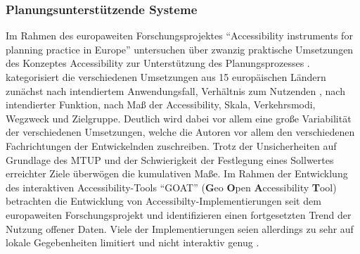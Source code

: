 \documentclass[11pt,pdftex,a4paper]{scrartcl}
\begin{document}
	\subsubsection{Planungsunterstützende Systeme}
	Im Rahmen des europaweiten Forschungsprojektes \enquote{Accessibility instruments for planning practice in Europe} \parencite{COSTActionTU1002} untersuchen \textcites{papaAccessibilityInstrumentsPlanning2016}{silvaAccessibilityInstrumentsPlanning2017}{papaLearningProcessAccessibility2017} über zwanzig praktische Umsetzungen des Konzeptes Accessibility zur Unterstützung des Planungsprozesses \parencite[\enquote{Planning Support Systems (PSS)}][135]{silvaAccessibilityInstrumentsPlanning2017}.
	\textcite{papaAccessibilityInstrumentsPlanning2016} kategorisiert die verschiedenen Umsetzungen aus 15 europäischen Ländern zunächst nach intendiertem Anwendungsfall, Verhältnis zum Nutzenden , nach intendierter Funktion, nach Maß der Accessibility, Skala, Verkehrsmodi, Wegzweck und Zielgruppe.
	Deutlich wird dabei vor allem eine große Variabilität der verschiedenen Umsetzungen, welche die Autoren vor allem den verschiedenen Fachrichtungen der Entwickelnden zuschreiben. Trotz der Unsicherheiten auf Grundlage des MTUP und der Schwierigkeit der Festlegung eines Sollwertes erreichter Ziele \parencites[vgl.][]{xiExploringImpactDifferent2018}[47]{levinsonTransportAccessManual2020} überwögen die kumulativen Maße.
	Im Rahmen der Entwicklung des interaktiven Accessibility-Tools \enquote{GOAT} (\textbf{G}eo \textbf{O}pen \textbf{A}ccessibility \textbf{T}ool) betrachten \textcite{pajaresAccessibilityProximityAddressing2021} die Entwicklung von Accessibilty-Implementierungen seit dem europaweiten Forschungsprojekt und identifizieren einen fortgesetzten Trend der Nutzung offener Daten. Viele der Implementierungen seien allerdings zu sehr auf lokale Gegebenheiten limitiert und nicht interaktiv genug \parencite[5f]{pajaresAccessibilityProximityAddressing2021}.
	
\end{document}
